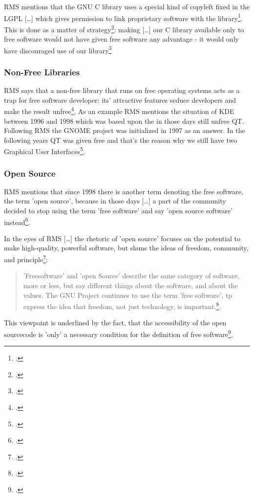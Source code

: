 \documentclass[DIV=calc,BCOR=5mm,11pt,headings=small,oneside,abstract=true, toc=bib]{scrartcl}
\begin{document}
RMS mentions that the GNU C library uses \glqq{}a special kind of
copyleft\grqq{} fixed in the LGPL \glqq{}[\ldots] which gives permission to link
proprietary software with the library\grqq{}\footcite[cf][23]{Stallman1999a}.
This is done as \glqq{} a matter of
strategy\grqq{}\footcite[cf][23]{Stallman1999a}: making \glqq{}[\ldots] our C
library available only to free software would not have given free software any
advantage - it would only have discouraged use of our
library\grqq{}\footcite[cf][23f]{Stallman1999a}

\subsubsection{Non-Free Libraries}

RMS says that \glqq{}a non-free library that runs on free operating systems acts
as a trap for free software developer\grqq{}: its’ attractive features seduce
developers and make the result unfree\footcite[cf][27]{Stallman1999a}, As an
example RMS mentions the situation of KDE between 1996 and 1998 which was based
upon the in those days still unfree QT. Following RMS the GNOME project was
initialized in 1997 as an answer. In the following years QT was given free and
that’s the reason why we still have two Graphical User
Interfaces\footcite[cf][27]{Stallman1999a}.

\subsubsection{Open Source}

RMS mentions that since 1998 there is another term denoting the free software,
the term ’open source’, because in those days \glqq{}[\ldots] a part of the
community decided to stop using the term ’free software’ and say ’open source
software’ instead\grqq{}\footcite[cf][29]{Stallman1999a}.

In the eyes of RMS \glqq{}[\ldots] the rhetoric of ’open source’ focuses on the
potential to make high-quality, powerful software, but shuns the ideas of
freedom, community, and principle\grqq{}\footcite[cf][30]{Stallman1999a}:

\begin{quote}\glqq{}’Freesoftware’ and ’open Source’ describe the same category
of software, more or less, but say different things about the software, and
about the values. The GNU Project continues to use the term ’free software’, tp
express the idea that freedom, not just technology, is
important.\grqq{}\footcite[cf][30]{Stallman1999a}.
\end{quote}

This viewpoint is underlined by the fact, that the accessibility of the open
sourcecode is ’only’ a necessary condition for the definition of free
software\footcite[cf][18]{Stallman1999a}.


\small

\end{document}
